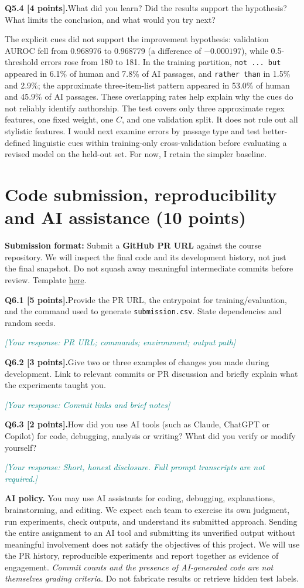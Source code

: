 \documentclass[11pt,letterpaper]{article}
\newcommand{\placeholder}[1]{\par\noindent\textcolor{teal}{\textit{[Your response: #1]}}\par\vspace{0.3em}}
\newcommand{\question}[2]{\needspace{4\baselineskip}\par\addvspace{0.45em}\noindent\textbf{#1}\quad #2\par\nobreak\vspace{0.1em}}
\begin{document}
\question{Q5.4 [4 points].}{What did you learn? Did the results support the hypothesis? What limits the conclusion, and what would you try next?}
The explicit cues did not support the improvement hypothesis: validation AUROC fell from 0.968976 to 0.968779 (a difference of $-0.000197$), while 0.5-threshold errors rose from 180 to 181. In the training partition, \texttt{not ... but} appeared in 6.1\% of human and 7.8\% of AI passages, and \texttt{rather than} in 1.5\% and 2.9\%; the approximate three-item-list pattern appeared in 53.0\% of human and 45.9\% of AI passages. These overlapping rates help explain why the cues do not reliably identify authorship. The test covers only three approximate regex features, one fixed weight, one $C$, and one validation split. It does not rule out all stylistic features. I would next examine errors by passage type and test better-defined linguistic cues within training-only cross-validation before evaluating a revised model on the held-out set. For now, I retain the simpler baseline.

\section{Code submission, reproducibility and AI assistance (10 points)}
\textbf{Submission format:} Submit a \textbf{GitHub PR URL} against the course repository. We will inspect the final code and its development history, not just the final snapshot. Do not squash away meaningful intermediate commits before review. Template \href{https://github.com/sekhari/human-or-ai-submissions}{here}.

\question{Q6.1 [5 points].}{Provide the PR URL, the entrypoint for training/evaluation, and the command used to generate \texttt{submission.csv}. State dependencies and random seeds.}
\placeholder{PR URL; commands; environment; output path}
\question{Q6.2 [3 points].}{Give two or three examples of changes you made during development. Link to relevant commits or PR discussion and briefly explain what the experiments taught you.}
\placeholder{Commit links and brief notes}
\question{Q6.3 [2 points].}{How did you use AI tools (such as Claude, ChatGPT or Copilot) for code, debugging, analysis or writing? What did you verify or modify yourself?}
\placeholder{Short, honest disclosure. Full prompt transcripts are not required.}

\textbf{AI policy.} You may use AI assistants for coding, debugging, explanations, brainstorming, and editing. We expect each team to exercise its own judgment, run experiments, check outputs, and understand its submitted approach. Sending the entire assignment to an AI tool and submitting its unverified output without meaningful involvement does not satisfy the objectives of this project. We will use the PR history, reproducible experiments and report together as evidence of engagement. \emph{Commit counts and the presence of AI-generated code are not themselves grading criteria.} Do not fabricate results or retrieve hidden test labels.
\end{document}
